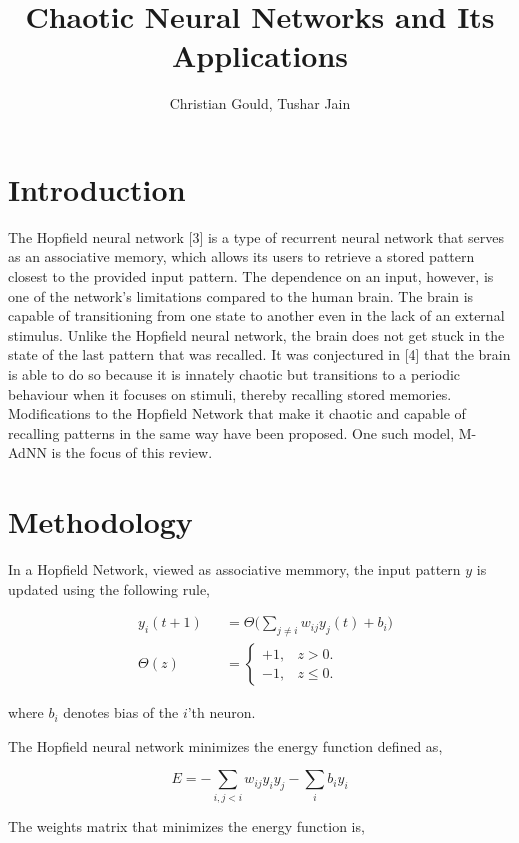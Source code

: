 \documentclass[12pt, letterpaper]{article}
\title{Chaotic Neural Networks and Its Applications}
\author{Christian Gould, Tushar Jain}
\date{}
\begin{document}
\maketitle

\newpage

\section*{Introduction}

The Hopfield neural network [3] is a type of recurrent neural network that serves as an associative memory, which allows its users to retrieve a stored pattern closest to the provided input pattern. The dependence on an input, however, is one of the network's limitations compared to the human brain. The brain is capable of transitioning from one state to another even in the lack of an external stimulus. Unlike the Hopfield neural network, the brain does not get stuck in the state of the last pattern that was recalled. It was conjectured in [4] that the brain is able to do so because it is innately chaotic but transitions to a periodic behaviour when it focuses on stimuli, thereby recalling stored memories. Modifications to the Hopfield Network that make it chaotic and capable of recalling patterns in the same way have been proposed. One such model, M-AdNN is the focus of this review.

\section*{Methodology}

In a Hopfield Network, viewed as associative memmory, the input pattern $y$ is updated using the following rule,

$$
\begin{aligned}
& y_i(t+1) &&= \Theta\big(\sum_{j \neq i} w_{ij}y_j(t) + b_i \big)\\
& \Theta(z) &&= \begin{cases}
  +1, & z > 0.\\
  -1, & z \le 0.
  \end{cases}
\end{aligned}
$$

where $b_i$ denotes bias of the $i$'th neuron.

The Hopfield neural network minimizes the energy function defined as,

$$
E = -\sum_{i,j < i} w_{ij}y_i y_j - \sum_{i} b_i y_i
$$

The weights matrix that minimizes the energy function is,
\end{document}
